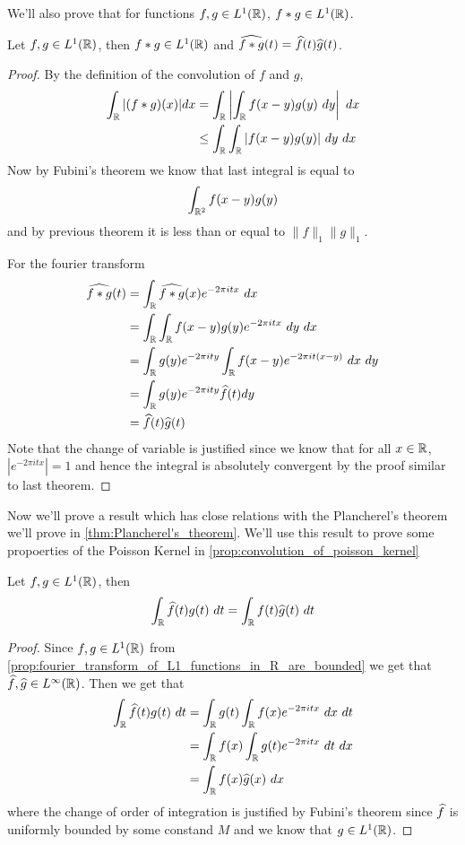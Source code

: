   We'll also prove that for functions $f, g \in L^1(\mathbb R)$, $f*g \in L^1(\mathbb R)$.
  \begin{proposition}
    \label{prop:convolution_is_well_defined_in_L^1(R)}
    Let $f, g \in L^1(\mathbb R)$, then $f*g \in L^1(\mathbb R)$ and $\widehat{f*g}(t) = \widehat{f}(t)\widehat{g}(t)$.
  \end{proposition}
  \begin{proof}
    By the definition of the convolution of $f$ and $g$, 
    \begin{align*}
      \int_\mathbb R|(f*g)(x)| dx &= \int_\mathbb R \left| \int_\mathbb R f(x-y)g(y) \ dy \right| \ dx \\
      & \le \int_\mathbb R \int_\mathbb R |f(x-y)g(y)| \ dy \ dx
    \end{align*}
    Now by Fubini's theorem we know that last integral is equal to $$\int_{\mathbb R^2}f(x-y)g(y) $$ and by previous theorem it is less than or equal to $\|f\|_1\|g\|_1$.

    For the fourier transform
    \begin{align*}
      \widehat{f*g}(t) &= \int_\R \widehat{f*g}(x) e^{-2 \pi itx} \ dx \\
      &= \int_\R \int_\R f(x-y)g(y) e^{-2 \pi itx} \ dy \ dx \\
      &= \int_\R g(y)e^{-2 \pi ity}\int_\R f(x-y) e^{-2 \pi it (x-y)} \ dx \ dy \\
      &= \int_\R g(y)e^{-2 \pi ity} \hatf(t) dy \\
      &= \hatf(t) \hatg(t) \\
    \end{align*}
    Note that the change of variable is justified since we know that  for all $x \in \mathbb R$, $|e^{-2\pi itx}| = 1$ and hence the integral is absolutely convergent by the proof similar to last theorem. 
  \end{proof}

  Now we'll prove a result which has close relations with the Plancherel's theorem we'll prove in \autoref{thm:Plancherel's_theorem}. We'll use this result to prove some propoerties of the Poisson Kernel in \autoref{prop:convolution_of_poisson_kernel}
\begin{proposition}
  Let $f, g \in L^1(\mathbb R)$, then $$\int_\mathbb R \widehat{f}(t) g(t) \ dt = \int_\mathbb R f(t) \widehat{g}(t) \ dt$$
\end{proposition}
\begin{proof}
  Since $f, g \in L^1(\mathbb R)$ from \autoref{prop:fourier_transform_of_L1_functions_in_R_are_bounded} we get that $\widehat{f}, \widehat{g} \in L^\infty(\mathbb R)$. Then we get that 
  \begin{align*}
    \int_\mathbb R \widehat{f}(t) g(t) \ dt &= \int_\mathbb R g(t) \int_\mathbb R f(x) e^{-2\pi itx} \ dx \ dt \\
    & = \int_\mathbb R f(x) \int_\mathbb R g(t) e^{-2\pi itx} \ dt \ dx \\
    & = \int_\mathbb R f(x)\widehat{g}(x) \ dx
  \end{align*}
  where the change of order of integration is justified by Fubini's theorem since $\widehat{f}$ is uniformly bounded by some constand $M$ and we know that $g \in L^1(\mathbb R)$.
\end{proof}

